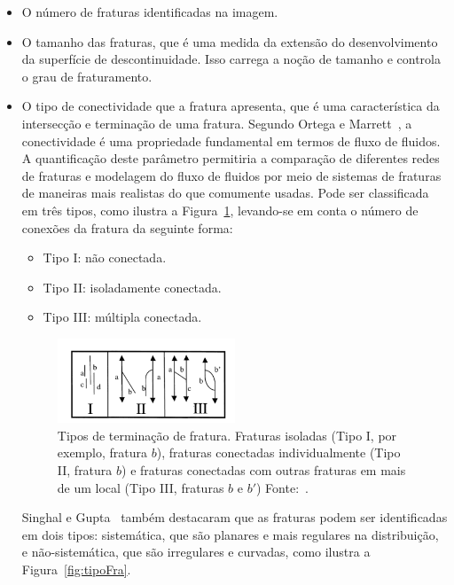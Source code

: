 \documentclass[a4paper,10pt,twocolumn,twoside]{article}
\begin{document}
\begin{itemize}

\item O número de fraturas identificadas na imagem.

\item O tamanho das fraturas, que é uma medida da extensão do desenvolvimento da superfície de descontinuidade. Isso carrega a noção de tamanho e controla o grau de fraturamento.

\item O tipo de conectividade que a fratura apresenta, que é uma característica da intersecção e terminação de uma fratura. Segundo Ortega e Marrett~\cite{ortega2000prediction}, a conectividade é uma propriedade fundamental em termos de fluxo de fluidos. A quantificação deste parâmetro permitiria a comparação de diferentes redes de fraturas e modelagem do fluxo de fluidos por meio de sistemas de fraturas de maneiras mais realistas do que comumente usadas. Pode ser classificada em três tipos, como ilustra a Figura~\ref{fig:tipoFraII}, levando-se em conta o número de conexões da fratura da seguinte forma:

\begin{itemize}
\item Tipo I: não conectada.
\item Tipo II: isoladamente conectada.
\item Tipo III: múltipla conectada.
\end{itemize}

\begin{figure}[!htb]
\centering
\includegraphics[width=0.5\textwidth]{Figuras/tipoFract-II.png}
\caption{Tipos de terminação de fratura. Fraturas isoladas (Tipo I, por exemplo, fratura $b$), fraturas conectadas individualmente (Tipo II, fratura $b$) e fraturas conectadas com outras fraturas em mais de um local (Tipo III, fraturas $b$ e $b'$) Fonte:~\protect\cite{ortega2000prediction}.}
\label{fig:tipoFraII}
\end{figure}

Singhal e Gupta~\cite{singhal2010applied} também destacaram que as fraturas podem ser identificadas em dois tipos: sistemática, que são planares e mais regulares na distribuição, e não-sistemática, que são irregulares e curvadas, como ilustra a Figura~\ref{fig:tipoFra}.


\end{itemize}
\end{document}
